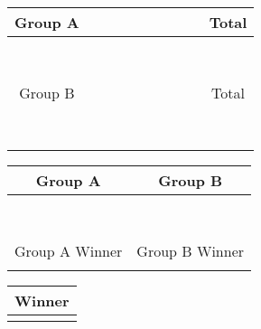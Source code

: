 \documentclass[landscape]{article}
\begin{document}
\centering
\begin{tabular}{|c|c|c|c|c|c|c|c|c|c|}
    \hline
    \rowcolor{red} Group A & & & & & & & & & Total \\
    \hline
    & \cellcolor{black} & & & & & & & & \cellcolor{red} \\
    \hline
    & & \cellcolor{black} & & & & & & & \cellcolor{red} \\
    \hline
    & & & \cellcolor{black} & & & & & & \cellcolor{red} \\
    \hline
    & & & & \cellcolor{black} & & & & & \cellcolor{red} \\
    \hline
    & & & & & \cellcolor{black} & & & & \cellcolor{red} \\
    \hline
    & & & & & & \cellcolor{black} & & & \cellcolor{red} \\
    \hline
    & & & & & & & \cellcolor{black} & & \cellcolor{red} \\
    \hline
    & & & & & & & & \cellcolor{black} & \cellcolor{red} \\
    \hline\hline
    \rowcolor{blue} Group B & & & & & & & & & Total \\
    \hline
    & \cellcolor{black} & & & & & & & & \cellcolor{blue} \\
    \hline
    & & \cellcolor{black} & & & & & & & \cellcolor{blue} \\
    \hline
    & & & \cellcolor{black} & & & & & & \cellcolor{blue} \\
    \hline
    & & & & \cellcolor{black} & & & & & \cellcolor{blue} \\
    \hline
    & & & & & \cellcolor{black} & & & & \cellcolor{blue} \\
    \hline
    & & & & & & \cellcolor{black} & & & \cellcolor{blue} \\
    \hline
    & & & & & & & \cellcolor{black} & & \cellcolor{blue} \\
    \hline
    & & & & & & & & \cellcolor{black} & \cellcolor{blue} \\
    \hline
\end{tabular}

\vspace{10pt}
\begin{tabular}{|c|c|c|c|}
  \hline
  \multicolumn{2}{|c|}{\cellcolor{red} Group A} & \multicolumn{2}{|c|}{\cellcolor{blue} Group B} \\
  \hline
  & & & \\
  \hline
  & & & \\
  \hline
  & & & \\
  \hline
  & & & \\
  \hline
  & & & \\
  \hline
  & & & \\
  \hline
  & & & \\
  \hline
  & & & \\
  \hline\hline
  \multicolumn{2}{|c|}{\cellcolor{magenta} Group A Winner} &  \multicolumn{2}{|c|}{\cellcolor{cyan} Group B Winner} \\
  \hline
  \multicolumn{2}{|c|}{} & \multicolumn{2}{|c|}{} \\
  \hline
\end{tabular}

\vspace{10pt}
\begin{tabular}{|c|}
  \hline
  \cellcolor{orange} Winner \\
  \hline
  \\
  \hline
\end{tabular}
\end{document}
